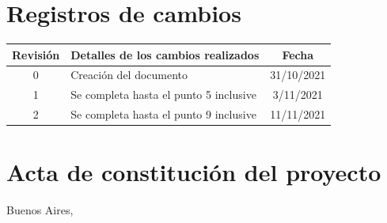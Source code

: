\documentclass[
11pt, %
]{charter}
\begin{document}
\maketitle
\thispagestyle{empty}
\pagebreak


\thispagestyle{empty}
{\setlength{\parskip}{0pt}
\tableofcontents{}
}
\pagebreak


\section*{Registros de cambios}
\label{sec:registro}


\begin{table}[ht]
\label{tab:registro}
\centering
\begin{tabularx}{\linewidth}{@{}|c|X|c|@{}}
\hline
\rowcolor[HTML]{C0C0C0} 
Revisión & \multicolumn{1}{c|}{\cellcolor[HTML]{C0C0C0}Detalles de los cambios realizados} & Fecha      \\ \hline
0      & Creación del documento                                 & 31/10/2021 \\ \hline
1      & Se completa hasta el punto 5 inclusive                 & 3/11/2021 \\ \hline
2      & Se completa hasta el punto 9 inclusive
& 11/11/2021 \\ \hline
\end{tabularx}
\end{table}

\pagebreak



\section*{Acta de constitución del proyecto}
\label{sec:acta}

\begin{flushright}
Buenos Aires, \fechaInicioName
\end{flushright}

\vspace{2cm}
\end{document}

